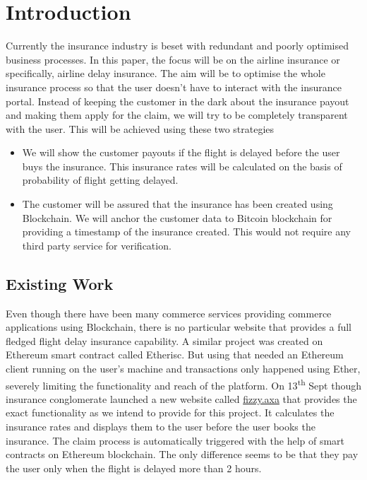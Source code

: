 \chapter{Introduction}

Currently the insurance industry is beset with redundant and poorly optimised business processes. In this paper, the focus will be on the airline insurance or specifically, airline delay insurance. The aim will be to optimise the whole insurance process so that the user doesn't have to interact with the insurance portal. Instead of keeping the customer in the dark about the insurance payout and making them apply for the claim, we will try to be completely  transparent with the user. This will be  achieved using these two strategies
\begin{itemize}
    \item We will show the customer payouts if the flight is delayed before the user buys the insurance. This insurance rates will be calculated on the basis of probability of flight getting delayed.
    \item The customer will be assured that the insurance has been created using Blockchain. We will anchor the customer data to Bitcoin blockchain for providing a timestamp of the insurance created. This would not require any third party service for verification.
\end{itemize}

\section{Existing Work}
Even though there have been many commerce services providing commerce applications using Blockchain, there is no particular website that provides a full fledged flight delay insurance capability. A similar project was created on Ethereum smart contract called Etherisc. But using that needed an Ethereum client running on the user's machine and transactions only happened using Ether, severely limiting the functionality and reach of the platform.
On 13\textsuperscript{th} Sept though insurance conglomerate launched a new website called \url{fizzy.axa} that provides the exact functionality as we intend to provide for this project. It calculates the insurance rates and displays them to the user before the user books the insurance. The claim process is automatically triggered with the help of smart contracts on Ethereum blockchain. The only difference seems to be that they pay the user only when the flight is delayed more than 2 hours.


